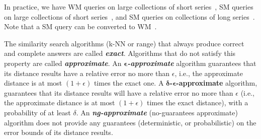 
In practice, we have WM queries on large collections of short series~\cite{SENTINEL-2,url:sds}, SM queries on large collections of short series~\cite{url:adhd}, and SM queries on collections of long series~\cite{url/data/seismic}.
Note that a SM query can be converted to WM~\cite{ulisse,journal/vldb/linardi19}.

The similarity search algorithms (k-NN or range) that always produce correct and complete answers are called \textit{\textbf{exact}}.
Algorithms that do not satisfy this property are called %
\textit{\textbf{approximate}}.
%
%
An {\textit{\bf$\bm{\epsilon}$-approximate}} algorithm guarantees that its distance results have a relative error no more than $\epsilon$, i.e., the approximate distance is at most $(1+\epsilon)$ times the exact one. 
A {\bf $\bm{\delta}$-$\bm{\epsilon}$-approximate} algorithm, guarantees that its distance results will have a relative error no more than $\epsilon$ (i.e., the approximate distance is at most $(1+\epsilon)$ times the exact distance), with a probability of at least $\delta$.
An \textit{\textbf{ng-approximate}} (no-guarantees approximate) algorithm does not provide any guarantees (deterministic, or probabilistic) on the error bounds of its distance results.

